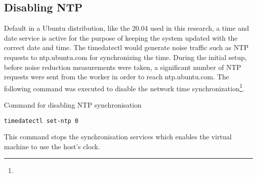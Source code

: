 \subsection{Disabling NTP}
\label{ss:DisableNTP}
Default in a Ubuntu distribution, like the 20.04 used in this research, a time and date service is active for the purpose of keeping the system updated with the correct date and time.
The timedatectl would generate noise traffic such as NTP requests to ntp.ubuntu.com for synchronizing the time.
During the initial setup, before noise reduction measurements were taken, a significant number of NTP requests were sent from the worker in order to reach ntp.ubuntu.com.
The following command was executed to disable the network time
synchronization\footnote{}.

\begin{listing}[!ht]
\caption{Command for disabling NTP synchronisation}
\label{lst:CommandDisableNTPSync}
\begin{verbatim}
timedatectl set-ntp 0
\end{verbatim}
\end{listing}

This command stops the synchronisation services which enables the virtual machine to use the host's clock.